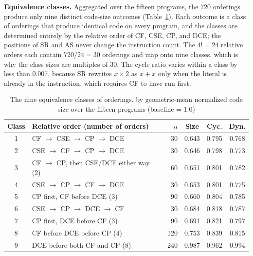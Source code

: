 \documentclass[conference]{IEEEtran}
\begin{document}
\textbf{Equivalence classes.} Aggregated over the fifteen programs, the 720 orderings produce only nine distinct code-size outcomes (Table~\ref{tab:classes}). Each outcome is a class of orderings that produce identical code on every program, and the classes are determined entirely by the relative order of CF, CSE, CP, and DCE; the positions of SR and AS never change the instruction count. The $4! = 24$ relative orders each contain $720/24 = 30$ orderings and map onto nine classes, which is why the class sizes are multiples of 30. The cycle ratio varies within a class by less than 0.007, because SR rewrites $x \times 2$ as $x + x$ only when the literal is already in the instruction, which requires CF to have run first.

\begin{table}[!htbp]
\centering
\caption{The nine equivalence classes of orderings, by geometric-mean normalized code size over the fifteen programs (baseline = 1.0)}
\label{tab:classes}
\renewcommand{\arraystretch}{1.15}
{\footnotesize
\setlength{\tabcolsep}{2.5pt}
\begin{tabular}{@{}clrccc@{}}
\toprule
\textbf{Class} & \textbf{Relative order (number of orders)} & \textbf{$n$} & \textbf{Size} & \textbf{Cyc.} & \textbf{Dyn.} \\
\midrule
1 & CF $\to$ CSE $\to$ CP $\to$ DCE & 30 & 0.643 & 0.795 & 0.768 \\
2 & CSE $\to$ CF $\to$ CP $\to$ DCE & 30 & 0.646 & 0.798 & 0.773 \\
3 & CF $\to$ CP, then CSE/DCE either way (2) & 60 & 0.651 & 0.801 & 0.782 \\
4 & CSE $\to$ CP $\to$ CF $\to$ DCE & 30 & 0.653 & 0.801 & 0.775 \\
5 & CP first, CF before DCE (3) & 90 & 0.660 & 0.804 & 0.785 \\
6 & CSE $\to$ CP $\to$ DCE $\to$ CF & 30 & 0.684 & 0.818 & 0.787 \\
7 & CP first, DCE before CF (3) & 90 & 0.691 & 0.821 & 0.797 \\
8 & CF before DCE before CP (4) & 120 & 0.753 & 0.839 & 0.815 \\
9 & DCE before both CF and CP (8) & 240 & 0.987 & 0.962 & 0.994 \\
\bottomrule
\end{tabular}
}
\end{table}
\end{document}
